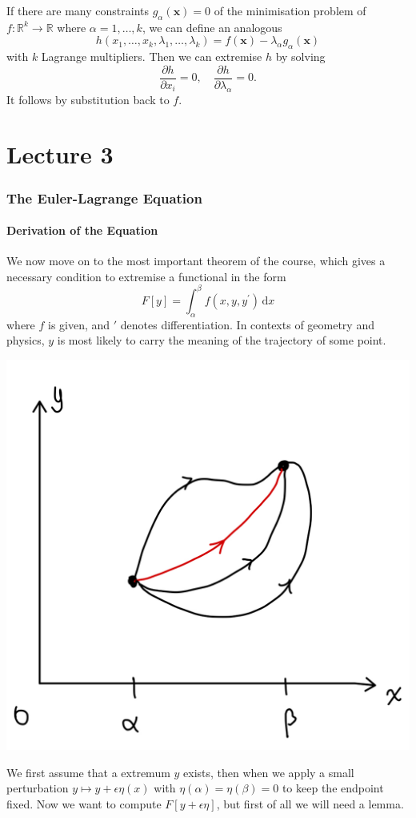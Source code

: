 \documentclass[a4paper]{article}
\begin{document}
If there are many constraints $g_\alpha(\mathbf{x})=0$ of the minimisation problem of $f:\mathbb R^k\to\mathbb R$ where $\alpha=1,\dots,k$, we can define an analogous
$$h(x_1,\ldots,x_k,\lambda_1,\ldots,\lambda_k)=f(\mathbf{x})-\lambda_\alpha g_\alpha(\mathbf{x})$$
with $k$ Lagrange multipliers. Then we can extremise $h$ by solving 
\[
    \frac{\partial h}{\partial x_i} = 0,\quad \frac{\partial h}{\partial \lambda_\alpha}=0.  
\]
It follows by substitution back to $f$.
\newpage
\part*{Lecture 3}
\section{The Euler-Lagrange Equation}
\subsection{Derivation of the Equation}
We now move on to the most important theorem of the course, which gives a necessary condition to extremise a functional in the form
$$F[y]=\int_\alpha^\beta f(x,y,y^\prime)\,\mathrm dx$$
where $f$ is given, and $'$ denotes differentiation.
In contexts of geometry and physics, $y$ is most likely to carry the meaning of the trajectory of some point.
\begin{center}
    \includegraphics[scale=0.12]{euler-lagrange1.jpeg}
\end{center}
We first assume that a extremum $y$ exists, then when we apply a small perturbation $y\mapsto y+\epsilon\eta(x)$ with $\eta(\alpha)=\eta(\beta)=0$ to keep the endpoint fixed.
Now we want to compute $F[y+\epsilon\eta]$, but first of all we will need a lemma.
\end{document}
